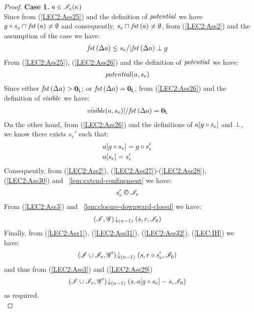 \begin{lemma}
\begin{proof}
\noindent\textbf{Case 1. }$a \in \mathscr{I}_e(\kappa_{})$\\
Since from (\ref{LEC2:Ass25}) and the definition of $\mathit{potential}$ we have $g \circ s_e \sqcap_{} \mathit{fst}\left(a\right) \not= \emptyset$ and consequently, $s_e \sqcap_{} \mathit{fst}\left(a\right) \not= \emptyset$, from (\ref{LEC2:Ass2}) and the assumption of the case we have:
%
\begin{align}
	\mathit{fst}\left(\Delta {a}\right) \leq s_e /| \mathit{fst}\left(\Delta {a}\right) \mathrel{\bot} g \label{LEC2:Ass26}
\end{align}
% 
From (\ref{LEC2:Ass25}), (\ref{LEC2:Ass26}) and the definition of $\mathit{potential}$ we have:
%
\begin{align}
	\mathit{potential}(a, s_e) \label{LEC2:Ass27}
\end{align}
%
Since either $\mathit{fst}\left(\Delta {a}\right) > \mathbf{0}_{\textsf{L}}$; or $\mathit{fst}\left(\Delta {a}\right) = \mathbf{0}_{\textsf{L}}$, from (\ref{LEC2:Ass26}) and the definition of $\mathit{visible}$ we have:
%
\begin{align}
	\mathit{visible}(a, s_e) |/ \mathit{fst}\left(\Delta {a}\right) = \mathbf{0}_{\textsf{L}} \label{LEC2:Ass28}
\end{align}
%
On the other hand, from (\ref{LEC2:Ass26}) and the definitions of $a[g \circ s_e]$ and $\mathrel{\bot}$, we know there exists $s_e'$ such that: 
%
\begin{align}
	& a[g \circ s_e] = g \circ s_e' \label{LEC2:Ass29}\\
	& a[s_e] = s_e'  \label{LEC2:Ass30}
\end{align}
%
Consequently, from (\ref{LEC2:Ass2}), (\ref{LEC2:Ass27})-(\ref{LEC2:Ass28}), (\ref{LEC2:Ass30}) and \lem~\ref{lem:extend-confinement} we have:
%
\begin{align}
	s_e' \confines \lmod_e  \label{LEC2:Ass31}
\end{align}
%
From (\ref{LEC2:Ass3}) and \lem~\ref{lem:closure-downward-closed} we have:
%
\begin{align}
	\left(\mathscr{I}, \mathscr{G}\right) \!\downarrow_{(n-1)} \left(s, r, \mathscr{I}_0\right)  \label{LEC2:Ass32}
\end{align}
%
Finally, from (\ref{LEC2:Ass1}), (\ref{LEC2:Ass31}), (\ref{LEC2:Ass32}), (\ref{LEC:IH}) we have:
%
\begin{align*}
	\left(\mathscr{I} \cup \mathscr{I}_{e}, \mathscr{G}'\right) \!\downarrow_{(n-1)} \left(s, r \circ s_e', \mathscr{I}_0\right)
\end{align*}
%
and thus from (\ref{LEC2:Ass3}) and (\ref{LEC2:Ass29}) 
%
\begin{align*}
	\left(\mathscr{I} \cup \mathscr{I}_{e}, \mathscr{G}'\right) \!\downarrow_{(n-1)} \left(s, a[g \circ s_e] - s, \mathscr{I}_0\right)
\end{align*}
%
as required.\\


\end{proof}
\end{lemma}
